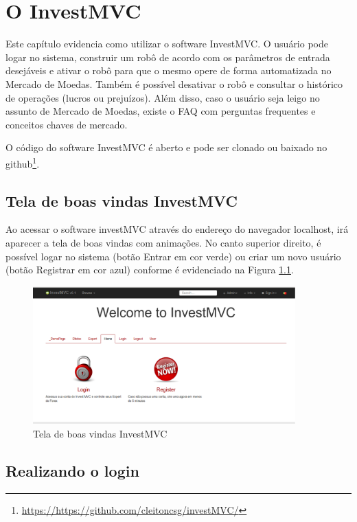 \chapter{O InvestMVC}
Este capítulo evidencia como utilizar o software InvestMVC. O usuário pode logar no sistema, construir um robô de acordo com os parâmetros de entrada desejáveis e ativar o robô para que o mesmo opere de forma automatizada no Mercado de Moedas. Também é possível desativar o robô e consultar o histórico de operações (lucros ou prejuízos). Além disso, caso o usuário seja leigo no assunto de Mercado de Moedas, existe o FAQ com perguntas frequentes e conceitos chaves de mercado.

O código do software InvestMVC é aberto e pode ser clonado ou baixado no github\footnote{\url{https://https://github.com/cleitoncsg/investMVC/}}.

\section{Tela de boas vindas InvestMVC}

Ao acessar o software investMVC através do endereço do navegador localhost, irá aparecer a tela de boas vindas com animações. No canto superior direito, é possível logar no sistema (botão Entrar em cor verde) ou criar um novo usuário (botão Registrar em cor azul) conforme é evidenciado na Figura \ref{telaInicial}.

\begin{figure}[H]
\centering
\includegraphics[width=0.9\textwidth]{figuras/telaInicial}
\caption{Tela de boas vindas InvestMVC}
\label{telaInicial}
\end{figure}

\section{Realizando o login}


